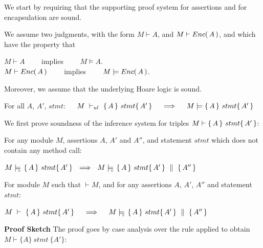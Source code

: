 We start by requiring  that the supporting proof system for assertions and for encapsulation are sound.
\begin{axiom}
\label{lemma:axiom:enc:assert:ul}
We assume two judgments, with the    form $M \vdash A$,  and $M \vdash {\ensuremath Enc(\, A\, )}$, and which have the property that
\begin{center}
$M \vdash A $ \ \ \ \ implies \ \ \ \ $M \models A$.\\
 $M \vdash {\ensuremath Enc(\, A\, )} $ \ \ \ \ implies \ \ \ \ $M \models {\ensuremath Enc(\, A\, )}$.
 \end{center}
\end{axiom}

Moreover, we assume that the underlying Hoare logic is sound.

\begin{axiom}
\label{ax:ul:sound}
For all $A$, $A'$, $stmt$:\ \ \  {$M\ \vdash_{ul}\  \triple A {stmt} {A'}  \ \ \ \  \Longrightarrow  \ \ \ \ \satisfies  {M} { \triple A {stmt} {A'}}$ }
\end{axiom}


\label{sect:prove:triples:sound}
We first prove soundness of the inference system for triples $M \vdash   \{\, A \, \}\ stmt \{\, A' \, \} $:

 
\begin{auxLemma}
\label{l:no:call}
For any module $M$, assertions $A$, $A'$ and $A''$, and statement $stmt$ which does not contain any method call:
\begin{center}
$  \satisfiesD {M} {\triple {A} {stmt} {A'} }  \ \ \Longrightarrow\ \  \satisfiesD {M} {\quadruple {A} {stmt} {A'} {A''}}$
\end{center}
\end{auxLemma}
 


\begin{Theorem}
\label{l:triples:sound}
For module  $M$ %
such that  $\vdash M$, and for any assertions $A$,  $A'$, $A''$ and statement  $stmt$:
\begin{center}
$M\ \vdash\  \triple A {stmt} {A'}  \ \ \ \  \Longrightarrow  \ \ \ \ \satisfiesD {M} {\quadruple {A} {stmt} {A'} {A''}}$
\end{center}
\end{Theorem}
 

\noindent
\vspace{.2cm}
 {\textbf{Proof Sketch}} 
The proof goes by case analysis over the rule applied to obtain $M \vdash \{ A \}\ stmt \  \{ A' \} $:

